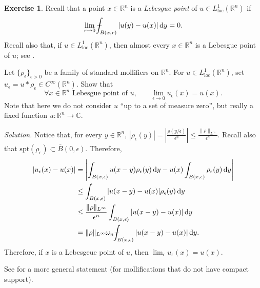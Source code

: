\documentclass[a4paper,9pt]{amsart}
\newcommand{\R}{\mathbb{R}}	%
\newcommand{\C}{\mathbb{C}}	%
\newcommand{\did}{\,\mathrm{d}}	%
\newcommand{\spt}{\mathrm{spt}}
\newcommand{\loc}{\mathrm{loc}}
\def\Xint#1{\mathchoice
      {\XXint\displaystyle\textstyle{#1}}%
      {\XXint\textstyle\scriptstyle{#1}}%
      {\XXint\scriptstyle\scriptscriptstyle{#1}}%
      {\XXint\scriptscriptstyle\scriptscriptstyle{#1}}%
      \!\int}
\def\XXint#1#2#3{{\setbox0=\hbox{$#1{#2#3}{\int}$}
        \vcenter{\hbox{$#2#3$}}\kern-.5\wd0}}
\def\fint{\Xint-}
\theoremstyle{plain}
\theoremstyle{definition}
\newtheorem{exercise}[proposition]{Exercise}%
\theoremstyle{remark}
\begin{document}
\begin{exercise}\label{ex68172771}
	Recall that a point $x\in\R^n$ is a \emph{Lebesgue point} of $u\in L^1_\loc(\R^n)$ if
	\begin{equation}
		\lim_{r\to0} \fint_{B(x,r)} |u(y)-u(x)| \did y = 0 .
	\end{equation}
	Recall also that, if $u\in L^1_\loc(\R^n)$, then almost every $x\in\R^n$ is a Lebesgue point of $u$; see \cite[Theorem (3.20),p.93]{MR767633}.
	
	Let $\{\rho_\epsilon\}_{\epsilon>0}$ be a family of standard mollifiers on $\R^n$.
	For $u\in L^1_\loc(\R^n)$, set $u_\epsilon = u*\rho_\epsilon \in C^\infty(\R^n)$.
	Show that %
	\begin{equation}\label{eq681727df}
		\forall x\in\R^n\text{ Lebesgue point of $u$,}\qquad
		\lim_{\epsilon\to0} u_\epsilon(x) = u(x) .
	\end{equation}
	Note that here we do not consider $u$ ``up to a set of measure zero'', but really a fixed function $u:\R^n\to\C$.
	
	{\it Solution.}
	Notice that, for every $y\in\R^n$,  $|\rho_\epsilon(y)| = \left|\frac{\rho(y/\epsilon)}{\epsilon^n}\right| \le \frac{\|\rho\|_{L^\infty}}{\epsilon^n}$.
	Recall also that $\spt(\rho_\epsilon)\subset \bar B(0,\epsilon)$.
	Therefore,
	\begin{align}
		|u_\epsilon(x) - u(x)|
		&= \left| \int_{B(x,\epsilon)} u(x-y) \rho_\epsilon(y) \did y - u(x) \int_{B(x,\epsilon)}\rho_\epsilon(y) \did y \right| \\
		&\le \int_{B(x,\epsilon)} |u(x-y) - u(x) |  \rho_\epsilon(y) \did y \\
		&\le \frac{\|\rho\|_{L^\infty}}{\epsilon^n} \int_{B(x,\epsilon)} |u(x-y) - u(x) | \did y \\
		&= \|\rho\|_{L^\infty}\omega_n \fint_{B(x,\epsilon)} |u(x-y) - u(x) | \did y .
	\end{align}
	Therefore, if $x$ is a Lebesgeue point of $u$, then 
	$\lim_\epsilon u_\epsilon(x) = u(x)$.
	
	See \cite[Theorem 8.15]{MR767633} for a more general statement (for mollifications that do not have compact support).
\end{exercise}
\end{document}
